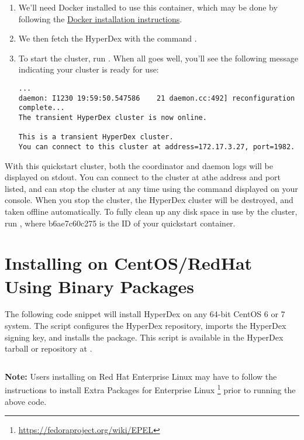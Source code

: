 \begin{enumerate}
\item We'll need Docker installed to use this container, which may be done by
following the \href{https://docs.docker.com/installation/}{Docker installation
instructions}.
\item We then fetch the HyperDex with the command .
\item To start the cluster, run .  When all goes well, you'll see the following message
indicating your cluster is ready for use:

\begin{verbatim}
...
daemon: I1230 19:59:50.547586    21 daemon.cc:492] reconfiguration complete...
The transient HyperDex cluster is now online.

This is a transient HyperDex cluster.
You can connect to this cluster at address=172.17.3.27, port=1982.
\end{verbatim}
\end{enumerate}

With this quickstart cluster, both the coordinator and daemon logs will be
displayed on stdout.  You can connect to the cluster at athe address and port
listed, and can stop the cluster at any time using the command displayed on your
console.  When you stop the cluster, the HyperDex cluster will be destroyed, and
taken offline automatically.  To fully clean up any disk space in use by the
cluster, run , where b6ae7c60c275 is the ID of your
quickstart container.

\section{Installing on CentOS/RedHat Using Binary Packages}

The following code snippet will install HyperDex on any 64-bit CentOS 6 or 7
system.  The script configures the HyperDex repository, imports the HyperDex
signing key, and installs the  package.  This script is available
in the HyperDex tarball or repository at .

\inputminted[frame=lines,framesep=2mm,firstline=5]{bash}{\topdir/install/centos-packages.sh}

\noindent\textbf{Note:}  Users installing on Red Hat Enterprise Linux may have
to follow the instructions to install Extra Packages for Enterprise Linux
\footnote{\url{https://fedoraproject.org/wiki/EPEL}} prior to running the above
code.

